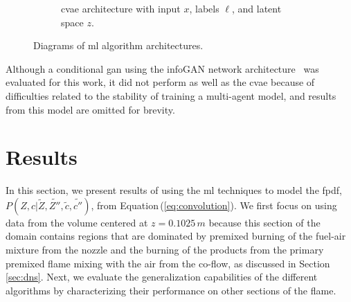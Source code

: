 \documentclass[review]{elsarticle}
\newcommand{\wt}[1]{\widetilde{#1}}
\begin{document}
\begin{figure}[!tbp]
\begin{subfigure}[t]{0.48\textwidth}
    \caption{\Gls{cvae} architecture with input $x$, labels $\ell$, and latent space $z$.}\label{fig:cvae}%
  \end{subfigure}%
  \caption{Diagrams of \gls{ml} algorithm architectures.}
\end{figure}%

Although a conditional \gls{gan} using the infoGAN network
architecture~\cite{Chen2016a} was evaluated for this work, it did not
perform as well as the \gls{cvae} because of difficulties related to the
stability of training a multi-agent model, and results from this model
are omitted for brevity.

\section{Results}\label{sec:results}

In this section, we present results of using the \gls{ml} techniques
to model the \gls{fpdf},
$P(Z,c | \wt{Z}, \wt{Z''}, \wt{c}, \wt{c''})$, from
Equation\,(\ref{eq:convolution}). We first focus on using data from
the volume centered at $z=0.1025\,\unit{m}$ because this section of
the domain contains regions that are dominated by premixed burning of
the fuel-air mixture from the nozzle and the burning of the products
from the primary premixed flame mixing with the air from the co-flow,
as discussed in Section\,\ref{sec:dns}. Next, we evaluate the
generalization capabilities of the different algorithms by
characterizing their performance on other sections of the flame.
\end{document}
